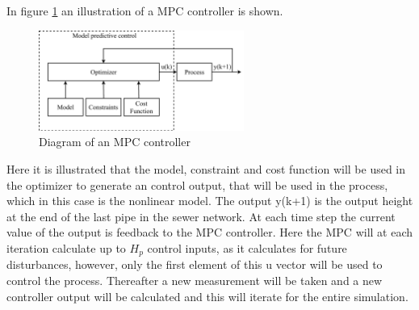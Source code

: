In figure \ref{fig:mpc_diagram} an illustration of a MPC controller is shown.
\begin{figure}[H]
	\centering
	\includegraphics[width=0.60\textwidth]{report/control/pictures/mpc_diagram}
	\caption{Diagram of an MPC controller}
	\label{fig:mpc_diagram}
\end{figure}

Here it is illustrated that the model, constraint and cost function will be used in the optimizer to generate an control output, that will be used in the process, which in this case is the nonlinear model. The output y(k+1) is the output height at the end of the last pipe in the sewer network. At each time step the current value of the output is feedback to the MPC controller. Here the MPC will at each iteration calculate up to $H_p$ control inputs, as it calculates for future disturbances, however, only the first element of this u vector will be used to control the process. Thereafter a new measurement will be taken and a new controller output will be calculated and this will iterate for the entire simulation.

